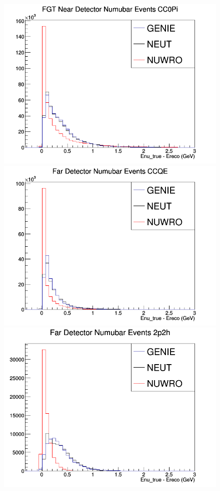 \documentclass[12pt]{article}
\begin{document}
\begin{figure}[h]
\endminipage
{}
\includegraphics[width=\linewidth]{Ereco_Etrue/numubar_FGT_CC0Pi.png}
\endminipage
\newline
{}
\includegraphics[width=\linewidth]{Ereco_Etrue/numubar_FD_CCQE.png}
\endminipage
{}
\includegraphics[width=\linewidth]{Ereco_Etrue/numubar_FD_2p2h.png}

\end{figure}
\end{document}

